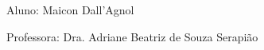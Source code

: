 \begin{folhaderosto}
	\begin{center}		
		
		\vspace*{\fill}\vspace*{\fill}
		\begin{center}
			\ABNTEXchapterfont\bfseries\Large\imprimirtitulo
		\end{center}
		\vspace*{\fill}
		
		\hspace{.45\textwidth}
		\begin{minipage}{.5\textwidth}
			\SingleSpacing
			\imprimirpreambulo
		\end{minipage}%
		
		\vspace*{1cm}
		\begin{flushright}
			\noindent Aluno: Maicon Dall'Agnol
		\end{flushright}
		\vspace*{1cm}
		\begin{flushright}
			\noindent Professora: Dra. Adriane Beatriz de Souza Serapião
		\end{flushright}
		\vspace*{1cm}
				
				
		{\large\imprimirlocal}
		\par
		{\large\imprimirdata}
		\vspace*{1cm}
		
	\end{center}
\end{folhaderosto}